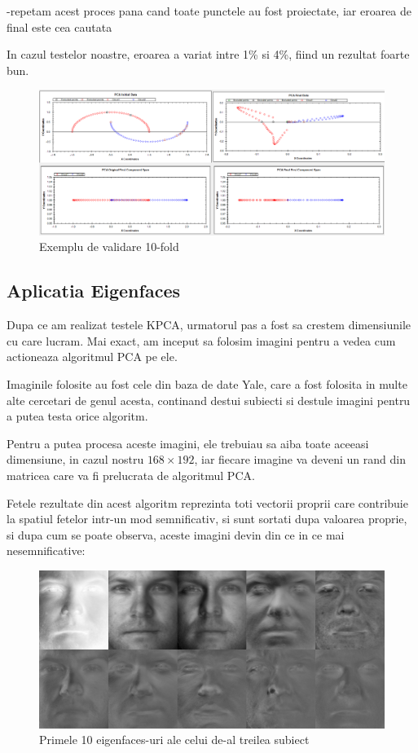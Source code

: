 \documentclass[12pt,oneside]{article}
\begin{document}
-repetam acest proces pana cand toate punctele au fost proiectate, iar eroarea de final este cea cautata

In cazul testelor noastre, eroarea a variat intre 1\% si 4\%, fiind un rezultat foarte bun.

\begin{figure}[H]
\centering
\caption{Exemplu de validare 10-fold}
\includegraphics[width=\linewidth]{tenfold1}
\end{figure}

\newpage

\subsection{Aplicatia Eigenfaces}
Dupa ce am realizat testele KPCA, urmatorul pas a fost sa crestem dimensiunile cu care lucram. Mai exact, am inceput sa folosim imagini pentru a vedea cum actioneaza algoritmul PCA pe ele.

Imaginile folosite au fost cele din baza de date Yale, care a fost folosita in multe alte cercetari de genul acesta, continand destui subiecti si destule imagini pentru a putea testa orice algoritm.\cite{yale_db} \cite{KCLee05}

Pentru a putea procesa aceste imagini, ele trebuiau sa aiba toate aceeasi dimensiune, in cazul nostru $168 \times 192$, iar fiecare imagine va deveni un rand din matricea care va fi prelucrata de algoritmul PCA.

Fetele rezultate din acest algoritm reprezinta toti vectorii proprii care contribuie la spatiul fetelor intr-un mod semnificativ, si sunt sortati dupa valoarea proprie, si dupa cum se poate observa, aceste imagini devin din ce in ce mai nesemnificative: 

\begin{figure}[H]
\centering
\caption{Primele 10 eigenfaces-uri ale celui de-al treilea subiect}
\includegraphics[width=\linewidth]{eigenfaces}
\end{figure}
\end{document}

